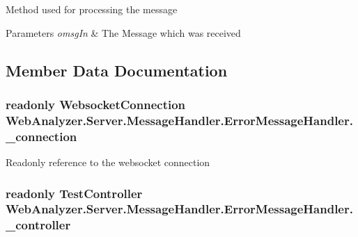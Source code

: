 Method used for processing the message 


\begin{DoxyParams}{Parameters}
{\em omsg\+In} & The Message which was received\\
\hline
\end{DoxyParams}


\subsection{Member Data Documentation}
\hypertarget{class_web_analyzer_1_1_server_1_1_message_handler_1_1_error_message_handler_afcc3d55e1eabc700cafcb9ce2d48106e}{}
\subsubsection[{\+\_\+connection}]{\setlength{\rightskip}{0pt plus 5cm}readonly {\bf Websocket\+Connection} Web\+Analyzer.\+Server.\+Message\+Handler.\+Error\+Message\+Handler.\+\_\+connection\hspace{0.3cm}{\ttfamily [private]}}\label{class_web_analyzer_1_1_server_1_1_message_handler_1_1_error_message_handler_afcc3d55e1eabc700cafcb9ce2d48106e}


Readonly reference to the websocket connection 

\hypertarget{class_web_analyzer_1_1_server_1_1_message_handler_1_1_error_message_handler_acdb5ea45d9c1e9f90af483dd53176fe3}{}
\subsubsection[{\+\_\+controller}]{\setlength{\rightskip}{0pt plus 5cm}readonly {\bf Test\+Controller} Web\+Analyzer.\+Server.\+Message\+Handler.\+Error\+Message\+Handler.\+\_\+controller\hspace{0.3cm}{\ttfamily [private]}}\label{class_web_analyzer_1_1_server_1_1_message_handler_1_1_error_message_handler_acdb5ea45d9c1e9f90af483dd53176fe3}


